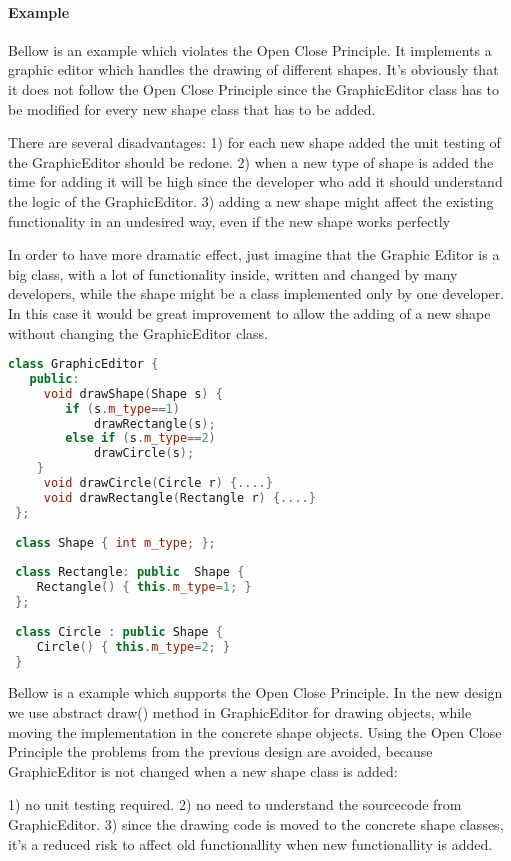 \documentclass{book}
\begin{document}
\paragraph{Example}

Bellow is an example which violates the Open Close Principle. It implements a graphic editor which handles the drawing of different shapes.
It's obviously that it does not follow the Open Close Principle since the GraphicEditor class has to be modified for every new shape class that has to be added.

There are several disadvantages:
1)    for each new shape added the unit testing of the GraphicEditor should be redone.
2)    when a new type of shape is added the time for adding it will be high since the developer who add it should understand the logic of the GraphicEditor.
3)    adding a new shape might affect the existing functionality in an undesired way, even if the new shape works perfectly

In order to have more dramatic effect, just imagine that the Graphic Editor is a big class, with a lot of functionality inside,
written and changed by many developers, while the shape might be a class implemented only by one developer.
In this case it would be great improvement to allow the adding of a new shape without changing the GraphicEditor class.

\begin{lstlisting}[caption={Open-Close Principle - bad example}, language=C++]
 class GraphicEditor {
   public:
     void drawShape(Shape s) {
 		if (s.m_type==1)
 			drawRectangle(s);
 		else if (s.m_type==2)
 			drawCircle(s);
 	}
 	 void drawCircle(Circle r) {....}
 	 void drawRectangle(Rectangle r) {....}
 };
 
 class Shape { int m_type; };
 
 class Rectangle: public  Shape {
 	Rectangle() { this.m_type=1; }
 };
 
 class Circle : public Shape {
 	Circle() { this.m_type=2; }
 } 
\end{lstlisting}

Bellow is a example which supports the Open Close Principle. In the new design we use abstract draw() method in GraphicEditor for drawing objects,
while moving the implementation in the concrete shape objects. Using the Open Close Principle the problems from the previous design are avoided,
because GraphicEditor is not changed when a new shape class is added:

1)    no unit testing required.
 2)   no need to understand the sourcecode from GraphicEditor.
  3)  since the drawing code is moved to the concrete shape classes, it's a reduced risk to affect old functionallity when new functionallity is added.
 
\end{document}

